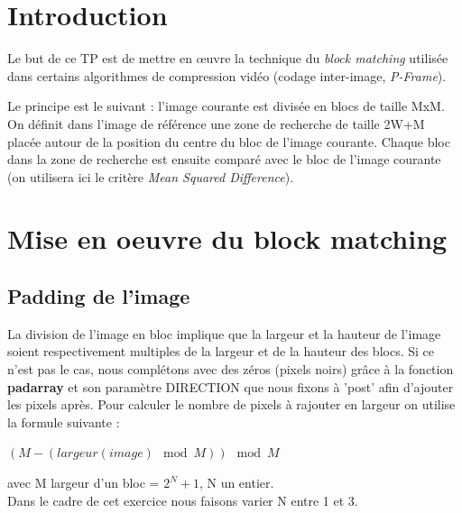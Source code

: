 \documentclass[a4paper, 12pt]{article}
\begin{document}






\clearpage

\section{Introduction}

Le but de ce TP est de mettre en œuvre la technique du \textit{block matching} utilisée dans certains algorithmes de compression vidéo (codage inter-image, \textit{P-Frame}).

Le principe est le suivant : l’image courante est divisée en blocs de taille MxM. On définit dans l’image de référence une zone de recherche de taille 2W+M placée autour de la position du centre du bloc de l’image courante. Chaque bloc dans la zone de recherche est ensuite comparé avec le bloc de l’image courante (on utilisera ici le critère \textit{Mean Squared Difference}).


\section{Mise en oeuvre du block matching}

\subsection{Padding de l'image}

La division de l'image en bloc implique que la largeur et la hauteur de l'image soient respectivement multiples de la largeur et de la hauteur des blocs. Si ce n'est pas le cas, nous complétons avec des zéros (pixels noirs) grâce à la fonction \textbf{padarray} et son paramètre DIRECTION que nous fixons à 'post' afin d'ajouter les pixels après. Pour calculer le nombre de pixels à rajouter en largeur on utilise la formule suivante : \\

\begin{center}
	$(M - (largeur(image) \mod M)) \mod M$ \\
\end{center}
avec M largeur d'un bloc = $2^N + 1$, N un entier.\\
Dans le cadre de cet exercice nous faisons varier N entre 1 et 3.\\
\end{document}
